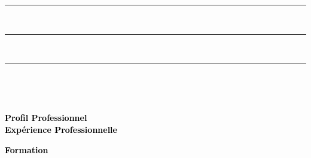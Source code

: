 \documentclass{article}
\begin{document}
\begin{paracol}{2}
\vspace{2mm}
{\color{gray}\rule{\linewidth}{0.4pt}} \\

{\color{black}{Langues}}

\vspace{2mm}
\vspace{2mm}
{\color{gray}\rule{\linewidth}{0.4pt}} \\

\vspace{2mm}
{\color{black}{Compétences Clés}}

\vspace{2mm}
\vspace{2mm}
{\color{gray}\rule{\linewidth}{0.4pt}} \\

\vspace{2mm}
{\color{black}{Centres d’intérêt}}

\vspace{2mm}

\vfill
~

\switchcolumn
\color{black}

\textcolor{black}{\Large \textbf{Profil Professionnel}} \\[2pt]

\textcolor{black}{\Large \textbf{Expérience Professionnelle}} \\[2pt]

\vspace{8mm}

\textcolor{black}{\Large \textbf{Formation}} \\[2pt]

\end{paracol}
\end{document}
